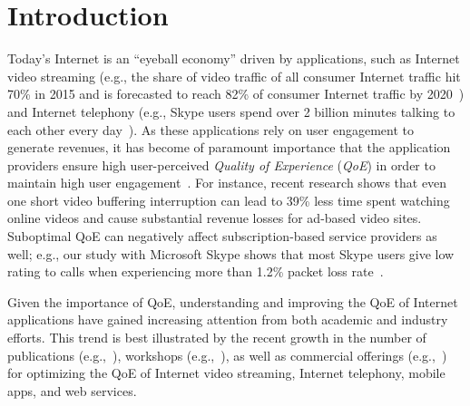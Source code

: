\chapter{Introduction}


Today's Internet is an ``eyeball economy'' driven by applications, such 
as Internet video streaming (e.g., the share of video traffic of all consumer Internet 
traffic  hit 70\% in 2015 and is forecasted to reach 82\% of consumer Internet traffic by 
2020~\cite{cisco-forecast-2015}) and Internet telephony (e.g., Skype users spend over 
2 billion minutes talking to each other every day~\cite{skype-2-billion-minutes}). 
As these applications rely on user engagement to generate revenues, 
it has become of paramount importance that the
application providers ensure high user-perceived 
{\em Quality of Experience} ({\em QoE}) in order to maintain high user 
engagement~\cite{sigcomm13athula,akamai-imc12}.
For instance, recent research shows that even one short video buffering 
interruption can lead to 39\% less time spent watching online videos and 
cause substantial  revenue losses for ad-based video sites. 
Suboptimal QoE can negatively affect subscription-based 
service providers as well; e.g., our study with Microsoft Skype 
shows that most Skype users give low rating to calls when experiencing more than
1.2\% packet loss rate~\cite{via}.

Given the importance of QoE, understanding and improving the QoE of Internet applications 
have gained increasing attention from both academic and industry efforts. 
This trend is best illustrated by the recent growth in the number of 
publications (e.g.,~\cite{sigcomm13athula,sigcomm12,
wang2014speedy,sigcomm11,eona,akamai-imc12}), workshops 
(e.g.,~\cite{workshop-wmust,workshop-fhmn,workshop-qoe}), 
as well as commercial offerings (e.g.,~\cite{conviva,artizanetworks}) for optimizing the QoE 
of Internet video streaming, Internet telephony, mobile 
apps, and web services.

